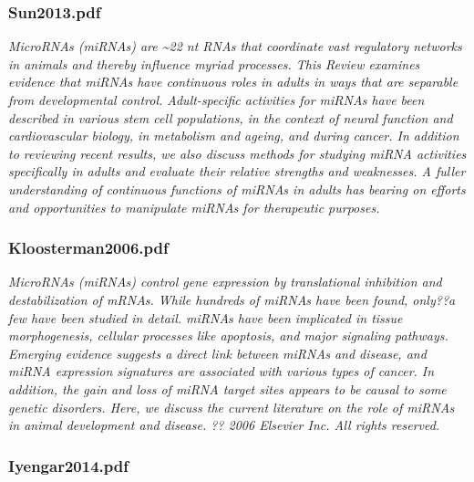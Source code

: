 \documentclass[graybox]{svmult}
\begin{document}
\subsubsection{Sun2013.pdf}

\cite{Sun2013}
\textit{MicroRNAs (miRNAs) are {\~{}}22 nt RNAs that coordinate vast regulatory networks in animals and thereby influence myriad processes. This Review examines evidence that miRNAs have continuous roles in adults in ways that are separable from developmental control. Adult-specific activities for miRNAs have been described in various stem cell populations, in the context of neural function and cardiovascular biology, in metabolism and ageing, and during cancer. In addition to reviewing recent results, we also discuss methods for studying miRNA activities specifically in adults and evaluate their relative strengths and weaknesses. A fuller understanding of continuous functions of miRNAs in adults has bearing on efforts and opportunities to manipulate miRNAs for therapeutic purposes.}
\subsubsection{Kloosterman2006.pdf}

\cite{Kloosterman2006}
\textit{MicroRNAs (miRNAs) control gene expression by translational inhibition and destabilization of mRNAs. While hundreds of miRNAs have been found, only??a few have been studied in detail. miRNAs have been implicated in tissue morphogenesis, cellular processes like apoptosis, and major signaling pathways. Emerging evidence suggests a direct link between miRNAs and disease, and miRNA expression signatures are associated with various types of cancer. In addition, the gain and loss of miRNA target sites appears to be causal to some genetic disorders. Here, we discuss the current literature on the role of miRNAs in animal development and disease. ?? 2006 Elsevier Inc. All rights reserved.}

\subsubsection{Iyengar2014.pdf}
\end{document}
